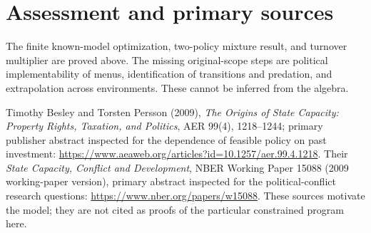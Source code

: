 \documentclass[11pt]{article}
\begin{document}
\section{Assessment and primary sources}
The finite known-model optimization, two-policy mixture result, and turnover multiplier are proved above. The missing original-scope steps are political implementability of menus, identification of transitions and predation, and extrapolation across environments. These cannot be inferred from the algebra.

Timothy Besley and Torsten Persson (2009), \emph{The Origins of State Capacity: Property Rights, Taxation, and Politics}, AER 99(4), 1218--1244; primary publisher abstract inspected for the dependence of feasible policy on past investment:
\url{https://www.aeaweb.org/articles?id=10.1257/aer.99.4.1218}.
Their \emph{State Capacity, Conflict and Development}, NBER Working Paper 15088 (2009 working-paper version), primary abstract inspected for the political-conflict research questions:
\url{https://www.nber.org/papers/w15088}. These sources motivate the model; they are not cited as proofs of the particular constrained program here.
\end{document}
